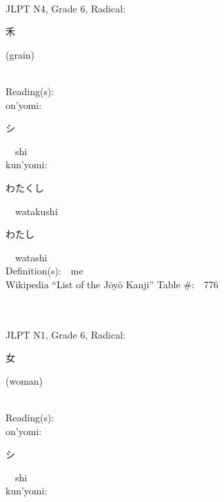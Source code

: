 \begin{multicols}{2}
{\fontsize{34pt}{40pt}  }\ \ \\  %
{JLPT N4, Grade 6, Radical:\ \ {\begin{CJK}{UTF8}{min} 禾 \end{CJK}} (grain) } \\
Reading(s):\ \ \\
{\hspace*{1em}}on'yomi:\ \ \\
{\hspace*{2em}}{\begin{CJK}{UTF8}{min} シ \end{CJK}}\ \ shi\ \ \\
{\hspace*{1em}}kun'yomi:\ \ \\
{\hspace*{2em}}{\begin{CJK}{UTF8}{min} わたくし \end{CJK}}\ \ watakushi\ \ \\
{\hspace*{2em}}{\begin{CJK}{UTF8}{min} わたし \end{CJK}}\ \ watashi\ \ \\
Definition(s):\ \ me \\
Wikipedia ``List of the J\=oy\=o Kanji'' Table \#:\ \ 776 \\
\ \ \\
{\fontsize{34pt}{40pt}  }\ \ \\  %
{JLPT N1, Grade 6, Radical:\ \ {\begin{CJK}{UTF8}{min} 女 \end{CJK}} (woman) } \\
Reading(s):\ \ \\
{\hspace*{1em}}on'yomi:\ \ \\
{\hspace*{2em}}{\begin{CJK}{UTF8}{min} シ \end{CJK}}\ \ shi\ \ \\
{\hspace*{1em}}kun'yomi:\ \ \\

\end{multicols}
